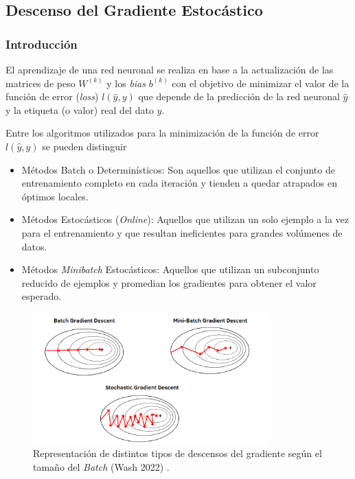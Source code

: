 \subsection{Descenso del Gradiente Estocástico} 

\subsubsection{Introducción }

El aprendizaje de una red neuronal se realiza en base a la actualización de las matrices de peso $W^{(k)}$ y los \textit{bias} $b^{(k)}$ con el objetivo de minimizar el valor de la función de error (\textit{loss}) $l(\hat{y},y)$ que depende de la predicción de la red neuronal $\hat{y}$ y la etiqueta (o valor) real del dato $y$. 

\vspace{0.2cm}

Entre los algoritmos utilizados para la minimización de la función de error $l(\hat{y},y)$ se pueden distinguir 
\begin{itemize}
    \item Métodos Batch o Determinísticos: Son aquellos que utilizan el conjunto de entrenamiento completo en cada iteración y tienden a quedar atrapados en óptimos locales. 
    
    \item Métodos Estocásticos (\textit{Online}): Aquellos que utilizan un solo ejemplo a la vez para el entrenamiento y que resultan ineficientes para grandes volúmenes de datos. 
    
    \item Métodos \textit{Minibatch} Estocásticos: Aquellos que utilizan un subconjunto reducido de ejemplos y promedian los gradientes para obtener el valor esperado.
    
\end{itemize}

\begin{figure}[ht]
    \centering
    \includegraphics[width=9cm]{img/tesis/SGD.png}
    \caption{Representación de distintos tipos de descensos del gradiente según el tamaño del \textit{Batch} (Wash 2022) \cite{GradientDescent}.}
    \label{fig:SGD}
\end{figure}

